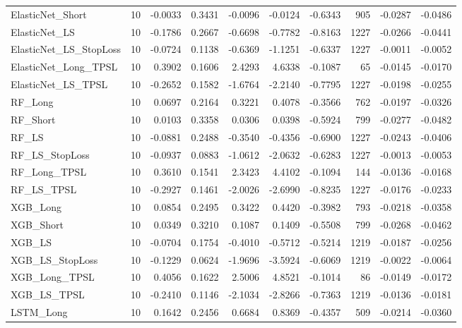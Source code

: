 \begin{tabular}{llrrrrrrrr}
\cline{1-10}
ElasticNet\_Short & 10 & -0.0033 & 0.3431 & -0.0096 & -0.0124 & -0.6343 & 905 & -0.0287 & -0.0486 \\
\cline{1-10}
ElasticNet\_LS & 10 & -0.1786 & 0.2667 & -0.6698 & -0.7782 & -0.8163 & 1227 & -0.0266 & -0.0441 \\
\cline{1-10}
ElasticNet\_LS\_StopLoss & 10 & -0.0724 & 0.1138 & -0.6369 & -1.1251 & -0.6337 & 1227 & -0.0011 & -0.0052 \\
\cline{1-10}
ElasticNet\_Long\_TPSL & 10 & 0.3902 & 0.1606 & 2.4293 & 4.6338 & -0.1087 & 65 & -0.0145 & -0.0170 \\
\cline{1-10}
ElasticNet\_LS\_TPSL & 10 & -0.2652 & 0.1582 & -1.6764 & -2.2140 & -0.7795 & 1227 & -0.0198 & -0.0255 \\
\cline{1-10}
RF\_Long & 10 & 0.0697 & 0.2164 & 0.3221 & 0.4078 & -0.3566 & 762 & -0.0197 & -0.0326 \\
\cline{1-10}
RF\_Short & 10 & 0.0103 & 0.3358 & 0.0306 & 0.0398 & -0.5924 & 799 & -0.0277 & -0.0482 \\
\cline{1-10}
RF\_LS & 10 & -0.0881 & 0.2488 & -0.3540 & -0.4356 & -0.6900 & 1227 & -0.0243 & -0.0406 \\
\cline{1-10}
RF\_LS\_StopLoss & 10 & -0.0937 & 0.0883 & -1.0612 & -2.0632 & -0.6283 & 1227 & -0.0013 & -0.0053 \\
\cline{1-10}
RF\_Long\_TPSL & 10 & 0.3610 & 0.1541 & 2.3423 & 4.4102 & -0.1094 & 144 & -0.0136 & -0.0168 \\
\cline{1-10}
RF\_LS\_TPSL & 10 & -0.2927 & 0.1461 & -2.0026 & -2.6990 & -0.8235 & 1227 & -0.0176 & -0.0233 \\
\cline{1-10}
XGB\_Long & 10 & 0.0854 & 0.2495 & 0.3422 & 0.4420 & -0.3982 & 793 & -0.0218 & -0.0358 \\
\cline{1-10}
XGB\_Short & 10 & 0.0349 & 0.3210 & 0.1087 & 0.1409 & -0.5508 & 799 & -0.0268 & -0.0462 \\
\cline{1-10}
XGB\_LS & 10 & -0.0704 & 0.1754 & -0.4010 & -0.5712 & -0.5214 & 1219 & -0.0187 & -0.0256 \\
\cline{1-10}
XGB\_LS\_StopLoss & 10 & -0.1229 & 0.0624 & -1.9696 & -3.5924 & -0.6069 & 1219 & -0.0022 & -0.0064 \\
\cline{1-10}
XGB\_Long\_TPSL & 10 & 0.4056 & 0.1622 & 2.5006 & 4.8521 & -0.1014 & 86 & -0.0149 & -0.0172 \\
\cline{1-10}
XGB\_LS\_TPSL & 10 & -0.2410 & 0.1146 & -2.1034 & -2.8266 & -0.7363 & 1219 & -0.0136 & -0.0181 \\
\cline{1-10}
LSTM\_Long & 10 & 0.1642 & 0.2456 & 0.6684 & 0.8369 & -0.4357 & 509 & -0.0214 & -0.0360 \\

\end{tabular}
